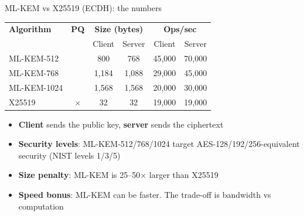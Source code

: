 \ifdefined\PRESENTATION\else\PassOptionsToClass{handout}{beamer}\fi\documentclass[aspectratio=169, lualatex]{beamer}
\begin{document}
\begin{frame}{ML-KEM vs X25519 (ECDH): the numbers}
	\begin{center}
		\begin{tabular}{|l|c|c|c|c|c|}
			\hline
			\textbf{Algorithm} & \textbf{PQ}  & \multicolumn{2}{c|}{\textbf{Size (bytes)}} & \multicolumn{2}{c|}{\textbf{Ops/sec}}                   \\
			                   &              & Client                                     & Server                                & Client & Server \\
			\hline
			ML-KEM-512         & \mycheckmark & 800                                        & 768                                   & 45,000 & 70,000 \\
			ML-KEM-768         & \mycheckmark & 1,184                                      & 1,088                                 & 29,000 & 45,000 \\
			ML-KEM-1024        & \mycheckmark & 1,568                                      & 1,568                                 & 20,000 & 30,000 \\
			X25519             & $\times$     & 32                                         & 32                                    & 19,000 & 19,000 \\
			\hline
		\end{tabular}
	\end{center}
	\begin{itemize}
		\item \textbf{Client} sends the public key, \textbf{server} sends the ciphertext
		\item \textbf{Security levels}: ML-KEM-512/768/1024 target AES-128/192/256-equivalent security (NIST levels 1/3/5)
		\item \textbf{Size penalty}: ML-KEM is 25--50$\times$ larger than X25519
		\item \textbf{Speed bonus}: ML-KEM can be faster. The trade-off is bandwidth vs computation
	\end{itemize}
\end{frame}
\end{document}
